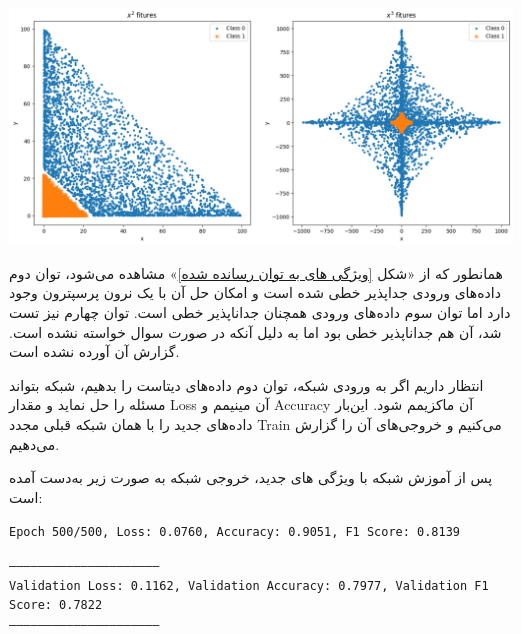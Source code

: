 \begin{enumerate}
\begin{qsolve}
		\begin{center}
			\includegraphics*[width=1\linewidth]{pics/img10.png}
			\label{ویژگی های به توان رسانده شده}
		\end{center}
		
		همانطور که از «شکل \ref{ویژگی های به توان رسانده شده}» مشاهده می‌شود، توان دوم داده‌های ورودی جداپذیر خطی شده است و امکان حل آن با یک نرون پرسپترون وجود دارد اما توان سوم داده‌های ورودی همچنان جداناپذیر خطی است. توان چهارم نیز تست شد، آن هم جداناپذیر خطی بود اما به دلیل آنکه در صورت سوال خواسته نشده است. گزارش آن آورده نشده است.
		
		انتظار داریم اگر به ورودی شبکه، توان دوم داده‌های دیتاست را بدهیم، شبکه بتواند مسئله را حل نماید و مقدار Loss آن مینیمم و Accuracy آن ماکزیمم شود. این‌بار داده‌های جدید را با همان شبکه قبلی مجدد Train می‌کنیم و خروجی‌های آن را گزارش می‌دهیم.
		
		پس از آموزش شبکه با ویژگی های جدید، خروجی شبکه به صورت زیر به‌دست آمده است:
		
		\begin{latin}
			\texttt{Epoch 500/500, Loss: 0.0760, Accuracy: 0.9051, F1 Score: 0.8139}\\
		\end{latin}
	\end{qsolve}
	
	
	\begin{qsolve}
		\begin{latin}
			\texttt{---------------------------------------------------------------}\\
			\texttt{Validation Loss: 0.1162, Validation Accuracy: 0.7977, Validation F1 Score: 0.7822}\\
			\texttt{---------------------------------------------------------------}\\
		\end{latin}
		

\end{qsolve}
\end{enumerate}
